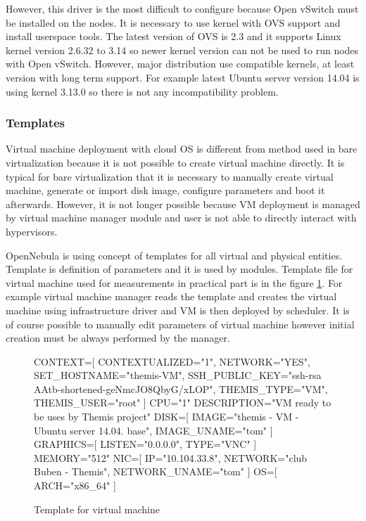 However, this driver is the most difficult to configure because Open vSwitch must be installed on the nodes. It is necessary to use kernel with \Ac{OVS} support and install userspace tools. The latest version of \Ac{OVS} is 2.3 and it supports Linux kernel version 2.6.32 to 3.14 so newer kernel version can not be used to run nodes with Open vSwitch. However, major distribution use compatible kernels, at least version with long term support. For example latest Ubuntu server version 14.04 is using kernel 3.13.0 so there is not any incompatibility problem.

\subsubsection{Templates}
Virtual machine deployment with cloud \Ac{OS} is different from method used in bare virtualization because it is not possible to create virtual machine directly. It is typical for bare virtualization that it is necessary to manually create virtual machine, generate or import disk image, configure parameters and boot it afterwards. However, it is not longer possible because \Ac{VM} deployment is managed by virtual machine manager module and user is not able to directly interact with hypervisors. 

OpenNebula is using concept of templates for all virtual and physical entities. Template is definition of parameters and it is used by modules. Template file for virtual machine used for measurements in practical part is in the figure \ref{code:template}. For example virtual machine manager reads the template and creates the virtual machine using infrastructure driver and \Ac{VM} is then deployed by scheduler. It is of course possible to manually edit parameters of virtual machine however initial creation must be always performed by the manager.

\begin{figure}[htb]
\caption{Template for virtual machine}
\label{code:template}
\begin{verbatimtab}
CONTEXT=[
	CONTEXTUALIZED="1",
	NETWORK="YES",
	SET_HOSTNAME="themis-VM",
	SSH_PUBLIC_KEY="ssh-rsa AAtb-shortened-geNmcJO8QbyG/xLOP",
	THEMIS_TYPE="VM",
	THEMIS_USER="root"
	]
CPU="1"
DESCRIPTION="VM ready to be uses by Themis project"
DISK=[
	IMAGE="themis - VM - Ubuntu server 14.04. base",
	IMAGE_UNAME="tom"
	]
GRAPHICS=[
	LISTEN="0.0.0.0",
	TYPE="VNC"
	]
MEMORY="512"
NIC=[
	IP="10.104.33.8",
	NETWORK="club Buben - Themis",
	NETWORK_UNAME="tom"
	]
OS=[
	ARCH="x86_64"
	]
\end{verbatimtab}
\end{figure}

